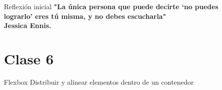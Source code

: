 \documentclass[aspectratio=169,11.5pt]{beamer}
\title{\CourseName}
\author{\Instructor}
\date{\today}
\begin{document}
    \TitleSlide

    \NormasSlide


    \begin{frame}{Reflexión inicial}
        \centering
        \textbf{\large
            "La única persona que puede decirte ‘no puedes lograrlo’ eres tú misma, y no debes escucharla"\\Jessica Ennis.}

        \vspace{0.4cm}
    \end{frame}





    \section{Clase 6}

    \SectionSlide
    {Flexbox}
    {Distribuir y alinear elementos dentro de un contenedor}
\end{document}
